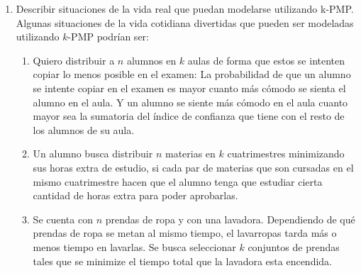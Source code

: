 \documentclass[11pt, a4paper, twoside]{article}
\begin{document}
\begin{enumerate}
\begin{enumerate}
		      
		\item Describir situaciones de la vida real que puedan modelarse utilizando k-PMP.
		Algunas situaciones de la vida cotidiana divertidas que pueden ser modeladas utilizando
		$k$-PMP podrían ser:
			  \begin{enumerate}
				\item Quiero distribuir a $n$ alumnos en $k$ aulas de forma que estos se intenten
				copiar lo menos posible en el examen: La probabilidad de que un alumno se intente
				copiar en el examen es mayor cuanto más cómodo se sienta el alumno en el aula. 
				Y un alumno
				se siente más cómodo en el aula cuanto mayor sea la sumatoria del índice de 
				confianza que tiene con el resto de los alumnos de su aula.
				
				\item Un alumno busca distribuir $n$ materias en $k$ cuatrimestres minimizando
				sus horas extra de estudio, si cada par de materias que son cursadas en el mismo
				cuatrimestre hacen que el alumno tenga que estudiar cierta cantidad de horas extra
				para poder aprobarlas.
				\item Se cuenta con $n$ prendas de ropa y con una lavadora. Dependiendo de qué prendas
				de ropa se metan al mismo tiempo, el lavarropas tarda más o menos tiempo en lavarlas. Se busca 
				seleccionar $k$ conjuntos de prendas tales que se minimize el tiempo total que la 
				lavadora esta encendida.
			  \end{enumerate}
    \end{enumerate}
    

\end{enumerate}
\end{document}
